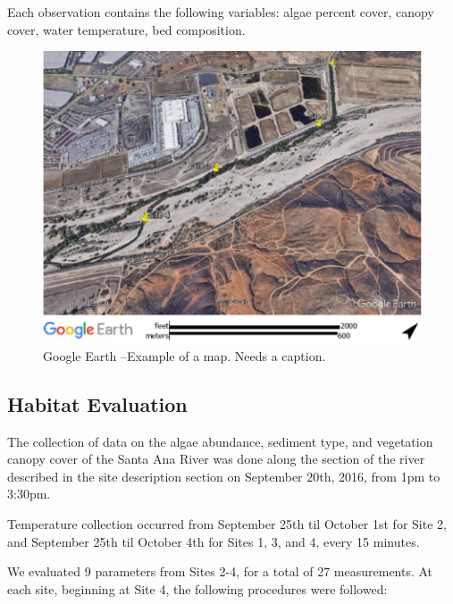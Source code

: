 \documentclass{article}
\begin{document}
Each observation contains the following variables: algae percent cover, canopy cover, water temperature, bed composition.  


\begin{figure}[!ht]
\includegraphics[width=1.00\textwidth]{Figures/SiteMap}
\caption{Google Earth --Example of a map. Needs a caption.}
\label{SAR_Image}
\end{figure}

\subsection{Habitat Evaluation}

The collection of data on the algae abundance, sediment type, and vegetation canopy cover of the Santa Ana River was done along the section of the river described in the site description section on September 20th, 2016, from 1pm to 3:30pm.

Temperature collection occurred from September 25th til October 1st for Site 2, and September 25th til October 4th for Sites 1, 3, and 4, every 15 minutes.

We evaluated 9 parameters from Sites 2-4, for a total of 27 measurements. At each site, beginning at Site 4, the following procedures were followed: 
\end{document}
